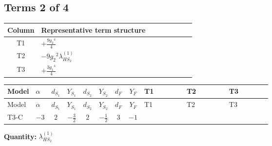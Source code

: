 \documentclass[8pt]{article}
\begin{document}
\begin{landscape}
\subsection*{Terms 2 of 4}
\begin{center}
\begin{tabular}{@{}c >{\raggedright\arraybackslash}p{0.82\linewidth}@{}}
\toprule
Column & Representative term structure \\
\midrule
T1 & \(\displaystyle +\frac{9 {g_2}^4}{4}\) \\
\midrule
T2 & \(\displaystyle -9 {g_2}^2 {\lambda_{HS_2}^{(1)}}\) \\
\midrule
T3 & \(\displaystyle +\frac{3 {g_1}^4}{4}\) \\
\midrule
\bottomrule
\end{tabular}
\end{center}
\smallskip
\tiny
\begin{longtable}{@{}llcccccc >{\raggedright\arraybackslash}p{0.21\linewidth} >{\raggedright\arraybackslash}p{0.21\linewidth} >{\raggedright\arraybackslash}p{0.21\linewidth}@{}}
\toprule
Model & $\alpha$ & $d_{S_1}$ & $Y_{S_1}$ & $d_{S_2}$ & $Y_{S_2}$ & $d_F$ & $Y_F$ & T1 & T2 & T3 \\
\midrule
\endfirsthead
\toprule
Model & $\alpha$ & $d_{S_1}$ & $Y_{S_1}$ & $d_{S_2}$ & $Y_{S_2}$ & $d_F$ & $Y_F$ & T1 & T2 & T3 \\
\midrule
\endhead
T3-C & $-3$ & $2$ & $-\frac{3}{2}$ & $2$ & $-\frac{1}{2}$ & $3$ & $-1$ & \scriptsize\adjustbox{max width=\linewidth}{$\begin{gathered} +\frac{9 {g_2}^4}{4}\end{gathered}$} & \scriptsize\adjustbox{max width=\linewidth}{$\begin{gathered} -9 {g_2}^2 {\lambda_{HS_2}^{(1)}}\end{gathered}$} & \scriptsize\adjustbox{max width=\linewidth}{$\begin{gathered} +\frac{3 {g_1}^4}{4}\end{gathered}$} \\
\midrule
\bottomrule
\end{longtable}
\clearpage
\noindent\textbf{Quantity: }$\lambda_{HS_2}^{(1)}$\par\smallskip

\end{landscape}
\end{document}
